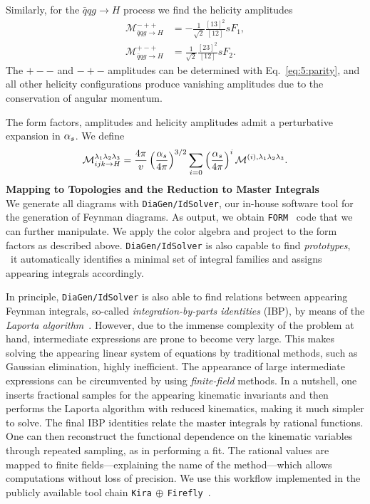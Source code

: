 Similarly, for the $\bar{q}q g \rightarrow H$ process we find the helicity amplitudes
\begin{equation}
\begin{split}
\mathcal{M}^{-++}_{\bar{q}q g \rightarrow H} &= - \frac{1}{\sqrt{2}} \frac{[13]^2}{[12]} s F_1, \\
\mathcal{M}^{+-+}_{\bar{q}q g \rightarrow H} &= \frac{1}{\sqrt{2}} \frac{[23]^2}{[12]} s F_2.
\end{split}
\end{equation}
The $+--$ and $-+-$ amplitudes can be determined with Eq.~\eqref{eq:5:parity}, and all other helicity configurations produce vanishing amplitudes due to the conservation of angular momentum.

The form factors, amplitudes and helicity amplitudes admit a perturbative expansion in $\alpha_s$. We define
\begin{equation}
\mathcal{M}^{\lambda_1\lambda_2 \lambda_3}_{ijk \rightarrow H} = \frac{4 \pi}{v}  \left(\frac{\alpha_s}{4 \pi}\right)^{3/2} \sum_{i = 0} \left(\frac{\alpha_s}{4 \pi} \right)^i \mathcal{M}^{(i),\lambda_1 \lambda_2 \lambda_3}.
\end{equation}
\textbf{Mapping to Topologies and the Reduction to Master Integrals} \\
We generate all diagrams with \texttt{DiaGen/IdSolver}, our in-house software tool for the generation of Feynman diagrams. As output, we obtain \texttt{FORM}~\cite{Vermaseren:2000nd, Ruijl:2017dtg} code that we can further manipulate. We apply the color algebra and project to the form factors as described above. \texttt{DiaGen/IdSolver} is also capable to find \textit{prototypes}, \ie\ it automatically identifies a minimal set of integral families and assigns appearing integrals accordingly.

In principle, \texttt{DiaGen/IdSolver} is also able to find relations between appearing Feynman integrals, so-called \textit{integration-by-parts identities} (\acs{IBP}), by means of the \textit{Laporta algorithm}~\cite{Laporta:2000dsw}. However, due to the immense complexity of the problem at hand, intermediate expressions are prone to become very large. This makes solving the appearing linear system of equations by traditional methods, such as Gaussian elimination, highly inefficient. The appearance of large intermediate expressions can be circumvented by using \textit{finite-field} methods. In a nutshell, one inserts fractional samples for the appearing kinematic invariants and then performs the Laporta algorithm with reduced kinematics, making it much simpler to solve. The final \acs{IBP} identities relate the master integrals by rational functions. One can then reconstruct the functional dependence on the kinematic variables through repeated sampling, as in performing a fit. The rational values are mapped to finite fields---explaining the name of the method---which allows computations without loss of precision. We use this workflow implemented in the publicly available tool chain \texttt{Kira$\,\oplus\,$Firefly}~\cite{Maierhofer:2017gsa, Maierhofer:2018gpa, Klappert:2020nbg}.

